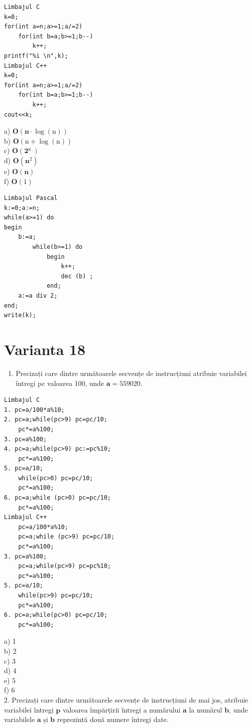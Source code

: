 \documentclass[10pt]{article}
\begin{document}
\begin{verbatim}
Limbajul C
k=0;
for(int a=n;a>=1;a/=2)
    for(int b=a;b>=1;b--)
        k++;
printf("%i \n",k);
Limbajul C++
k=0;
for(int a=n;a>=1;a/=2)
    for(int b=a;b>=1;b--)
        k++;
cout<<k;
\end{verbatim}

a) $\mathbf{O}(\mathbf{n} \cdot \log (\mathrm{n}))$\\
b) $\mathbf{O}(\mathrm{n}+\log (\mathrm{n}))$\\
c) $\mathbf{O}\left(\mathbf{2}^{\text {n }}\right)$\\
d) $\mathbf{O}\left(\mathbf{n}^{2}\right)$\\
e) $\mathbf{O}(\mathbf{n})$\\
f) $\mathbf{O}(1)$

\begin{verbatim}
Limbajul Pascal
k:=0;a:=n;
while(a>=1) do
begin
    b:=a;
        while(b>=1) do
            begin
                k++;
                dec (b) ;
            end;
    a:=a div 2;
end;
write(k);
\end{verbatim}

\section*{Varianta 18}
\begin{enumerate}
  \item Precizați care dintre următoarele secvențe de instrucțiuni atribuie variabilei întregi pc valoarea 100, unde $\mathbf{a}=559020$.
\end{enumerate}

\begin{verbatim}
Limbajul C
1. pc=a/100*a%10;
2. pc=a;while(pc>9) pc=pc/10;
    pc*=a%100;
3. pc=a%100;
4. pc=a;while(pc>9) pc:=pc%10;
    pc*=a%100;
5. pc=a/10;
    while(pc>0) pc=pc/10;
    pc*=a%100;
6. pc=a;while (pc>0) pc=pc/10;
    pc*=a%100;
Limbajul C++
    pc=a/100*a%10;
    pc=a;while (pc>9) pc=pc/10;
    pc*=a%100;
3. pc=a%100;
    pc=a;while(pc>9) pc=pc%10;
    pc*=a%100;
5. pc=a/10;
    while(pc>9) pc=pc/10;
    pc*=a%100;
6. pc=a;while(pc>0) pc=pc/10;
    pc*=a%100;
\end{verbatim}

a) 1\\
b) 2\\
c) 3\\
d) 4\\
e) 5\\
f) 6\\
2. Precizați care dintre următoarele secvențe de instrucțiuni de mai jos, atribuie variabilei întregi $\mathbf{p}$ valoarea împărțirii întregi a numărului $\mathbf{a}$ la numărul $\mathbf{b}$, unde variabilele $\mathbf{a}$ și $\mathbf{b}$ reprezintă două numere întregi date.
\end{document}
